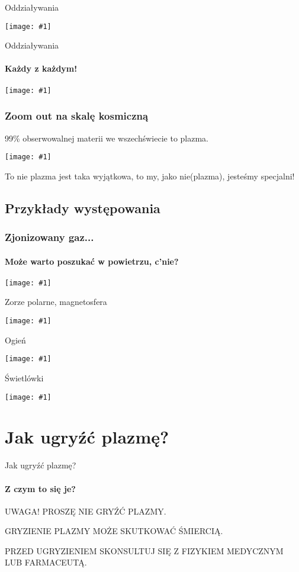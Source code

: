 \documentclass{beamer}
\newcommand {\framedgraphic}[1] {
        \begin{center}
            \texttt{[image: \#1]}
        \end{center}
}
\begin{document}
  \begin{frame}[t]{Oddziaływania}
    \framedgraphic{img/plasma_ionise_novectors.png}
  \end{frame}

  \begin{frame}[t]{Oddziaływania}
    \framesubtitle{Każdy z każdym!}
    \framedgraphic{img/plasma_ionise_vectors.png}
  \end{frame}



  \begin{frame}
    \frametitle{Zoom out na skalę kosmiczną}
    99\% obserwowalnej materii we wszechświecie to plazma.
    \pause
    \framedgraphic{img/starrynight}
    \pause
    To nie plazma jest taka wyjątkowa, to my, jako nie(plazma), jesteśmy specjalni!
  \end{frame}

\subsection{Przykłady występowania}

\begin{frame}
  \frametitle{Zjonizowany gaz...}
  \framesubtitle{Może warto poszukać w powietrzu, c'nie?}
  \framedgraphic{img/lightning.png}
\end{frame}

\begin{frame}[t]{Zorze polarne, magnetosfera}
  \framedgraphic{img/AuroraNorway.jpg}
\end{frame}

\begin{frame}[t]{Ogień}
  \framedgraphic{img/campfire.png}
\end{frame}

\begin{frame}[t]{Świetlówki}
  \framedgraphic{img/fluorescent}
\end{frame}

\section{Jak ugryźć plazmę?}
\begin{frame}[t]{Jak ugryźć plazmę?}
  \framesubtitle{Z czym to się je?}
  \pause
    \begin{alertblock}{UWAGA!}
    PROSZĘ NIE GRYŹĆ PLAZMY.

    GRYZIENIE PLAZMY MOŻE SKUTKOWAĆ ŚMIERCIĄ.

    PRZED UGRYZIENIEM SKONSULTUJ SIĘ Z FIZYKIEM MEDYCZNYM LUB FARMACEUTĄ.
  \end{alertblock}
\end{frame}
\end{document}
